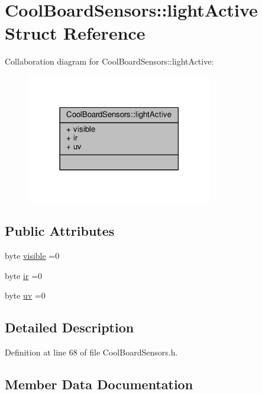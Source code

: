 \hypertarget{structCoolBoardSensors_1_1lightActive}{}\section{Cool\+Board\+Sensors\+:\+:light\+Active Struct Reference}
\label{structCoolBoardSensors_1_1lightActive}


Collaboration diagram for Cool\+Board\+Sensors\+:\+:light\+Active\+:\nopagebreak
\begin{figure}[H]
\begin{center}
\leavevmode
\includegraphics[width=230pt]{structCoolBoardSensors_1_1lightActive__coll__graph}
\end{center}
\end{figure}
\subsection*{Public Attributes}
\begin{DoxyCompactItemize}
\item 
byte \hyperlink{structCoolBoardSensors_1_1lightActive_abcbba296b6a95e67c0cd2555d9dd50c7}{visible} =0
\item 
byte \hyperlink{structCoolBoardSensors_1_1lightActive_a67700895349b95ceb263f1a6da756315}{ir} =0
\item 
byte \hyperlink{structCoolBoardSensors_1_1lightActive_a949a7aaf5166d981de8fe0fd93da20d6}{uv} =0
\end{DoxyCompactItemize}


\subsection{Detailed Description}


Definition at line 68 of file Cool\+Board\+Sensors.\+h.



\subsection{Member Data Documentation}
\mbox{\label{structCoolBoardSensors_1_1lightActive_a67700895349b95ceb263f1a6da756315}} 
